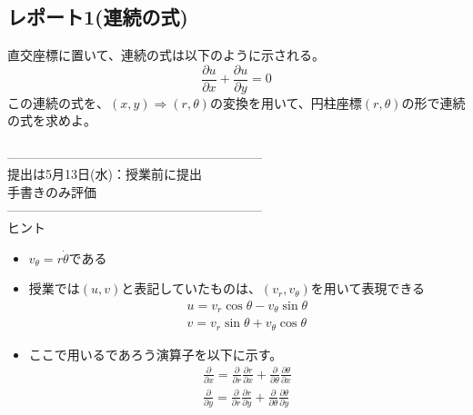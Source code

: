 \documentclass[a4j,twoside,openright,11pt]{jsarticle}
\begin{document}
\subsection*{レポート1(連続の式)}
直交座標に置いて、連続の式は以下のように示される。
\begin{equation}
\frac{\partial u}{\partial x} + \frac{\partial u}{\partial y} = 0
\end{equation}
この連続の式を、$(x,y) \Rightarrow (r,\theta)$の変換を用いて、円柱座標$(r,\theta)$の形で連続の式を求めよ。\\
\\
------------------------------------------------------------\\
提出は5月13日(水)：授業前に提出\\
手書きのみ評価\\
------------------------------------------------------------\\
ヒント
\begin{itemize}
\item $v_\theta=r\dot \theta$である
\item 授業では$(u,v)$と表記していたものは、$(v_r,v_\theta)$を用いて表現できる
\begin{eqnarray}
u=v_r\cos\theta - v_\theta\sin\theta\\
v=v_r\sin\theta + v_\theta\cos\theta
\end{eqnarray}
\item ここで用いるであろう演算子を以下に示す。
\begin{eqnarray}
\frac{\partial }{\partial x}=\frac{\partial }{\partial r}\frac{\partial r}{\partial x}+\frac{\partial }{\partial \theta}\frac{\partial \theta}{\partial x}\\
\frac{\partial }{\partial y}=\frac{\partial }{\partial r}\frac{\partial r}{\partial y}+\frac{\partial }{\partial \theta}\frac{\partial \theta}{\partial y}
\end{eqnarray}
\end{itemize}
\end{document}
